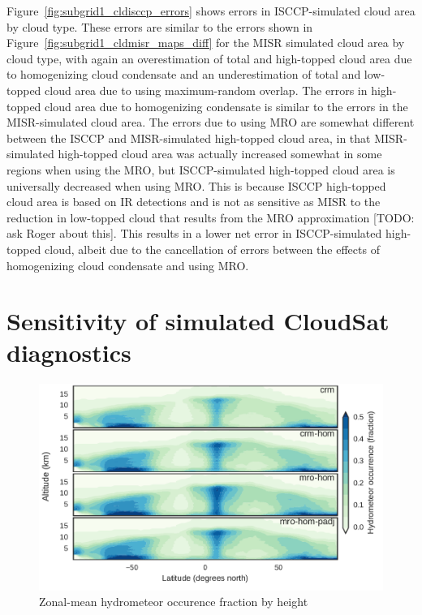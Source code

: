 Figure~\ref{fig:subgrid1_cldisccp_errors} shows errors in
ISCCP-simulated cloud area by cloud type. These errors are similar to
the errors shown in Figure~\ref{fig:subgrid1_cldmisr_maps_diff} for the
MISR simulated cloud area by cloud type, with again an overestimation of
total and high-topped cloud area due to homogenizing cloud condensate
and an underestimation of total and low-topped cloud area due to using
maximum-random overlap. The errors in high-topped cloud area due to
homogenizing condensate is similar to the errors in the MISR-simulated
cloud area. The errors due to using MRO are somewhat different between
the ISCCP and MISR-simulated high-topped cloud area, in that
MISR-simulated high-topped cloud area was actually increased somewhat in
some regions when using the MRO, but ISCCP-simulated high-topped cloud
area is universally decreased when using MRO. This is because ISCCP
high-topped cloud area is based on IR detections and is not as sensitive
as MISR to the reduction in low-topped cloud that results from the MRO
approximation {[}TODO: ask Roger about this{]}. This results in a lower
net error in ISCCP-simulated high-topped cloud, albeit due to the
cancellation of errors between the effects of homogenizing cloud
condensate and using MRO.

\section{Sensitivity of simulated CloudSat
diagnostics}\label{sensitivity-of-simulated-cloudsat-diagnostics}

\begin{figure}[htbp]
\centering
\includegraphics{graphics/subgrid1_hfba_zonal.pdf}
\caption{\label{fig:subgrid1_hfba_zonal}Zonal-mean hydrometeor occurence
fraction by height}\label{fig:subgrid1ux5fhfbaux5fzonal}
\end{figure}

